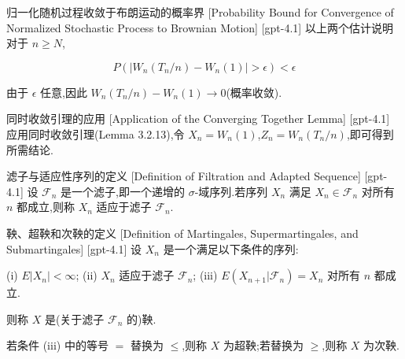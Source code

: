 \documentclass[UTF8]{ctexart}
\begin{document}
    
    
    \begin{ppt}
        {归一化随机过程收敛于布朗运动的概率界}
        [Probability Bound for Convergence of Normalized Stochastic Process to Brownian Motion]
        [gpt-4.1]
        以上两个估计说明对于 $n \geq N$,

\[
P( | W_n( T_n / n ) - W_n( 1 ) | > \epsilon ) < \epsilon
\]

由于 $\epsilon$ 任意,因此 $W_n( T_n / n ) - W_n( 1 ) \to 0$(概率收敛).

    \end{ppt}
    
    
    
    \begin{lma}
        {同时收敛引理的应用}
        [Application of the Converging Together Lemma]
        [gpt-4.1]
        应用同时收敛引理(Lemma 3.2.13),令 $X_n = W_n( 1 )$,$Z_n = W_n( T_n / n )$,即可得到所需结论.

    \end{lma}
    
    
    
    \begin{dfn}
        {滤子与适应性序列的定义}
        [Definition of Filtration and Adapted Sequence]
        [gpt-4.1]
        设 ${\mathcal{F}}_n$ 是一个滤子,即一个递增的 $\sigma$-域序列.若序列 $X_n$ 满足 $X_n \in {\mathcal{F}}_n$ 对所有 $n$ 都成立,则称 $X_n$ 适应于滤子 ${\mathcal{F}}_n$.
    \end{dfn}
    
    
    
    \begin{dfn}
        {鞅、超鞅和次鞅的定义}
        [Definition of Martingales, Supermartingales, and Submartingales]
        [gpt-4.1]
        设 $X_n$ 是一个满足以下条件的序列:

(i) $E|X_n|<\infty$;
(ii) $X_n$ 适应于滤子 ${\mathcal{F}}_n$;
(iii) $E(X_{n+1}|{\mathcal{F}}_n)=X_n$ 对所有 $n$ 都成立.

则称 $X$ 是(关于滤子 ${\mathcal{F}}_n$ 的)鞅.

若条件 (iii) 中的等号 $=$ 替换为 $\leq$,则称 $X$ 为超鞅;若替换为 $\geq$,则称 $X$ 为次鞅.
    \end{dfn}
    
\end{document}
